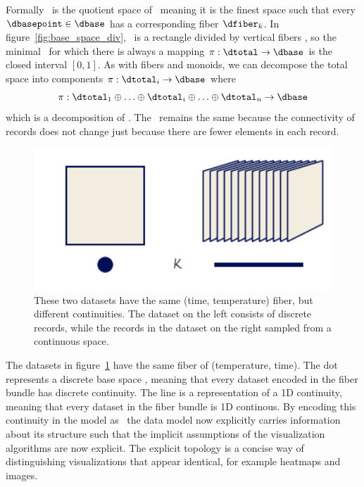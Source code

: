\documentclass[../main.tex]{subfiles}
\begin{document}
Formally \dbase\ is the quotient space \cite{QuotientSpaceTopology2020} of \dtotal\, meaning it is the finest space\cite{aurouxMath131Introduction} such that every $\dbasepoint \in \dbase$ has a corresponding fiber $\dfiber_k$\cite{QuotientSpaceTopology2020}. In figure~\ref{fig:base_space_div}, \dtotal\ is a rectangle divided by vertical fibers \dfiber, so the minimal \dbase\ for which there is always a mapping $\pi: \dtotal\rightarrow \dbase$ is the closed interval $\left[0,1\right]$. 
As with fibers and monoids, we can decompose the total space into components $\pi:\dtotal_i\rightarrow \dbase$ where
\begin{equation}
    \pi:\dtotal_1\oplus\ldots\oplus \dtotal_i \oplus\ldots \oplus \dtotal_n \rightarrow \dbase
\end{equation}
which is a decomposition of \dfiber. The \dbase\ remains the same because the connectivity of records does not change just because there are fewer elements in each record.
\begin{figure}[H]
    \includegraphics[width=1\textwidth]{figures/math/base.png}
    \caption{These two datasets have the same (time, temperature) fiber, but different continuities. The dataset on the left consists of discrete records, while the records in the dataset on the right sampled from a continuous space.} 
    \label{fig:base_example}
\end{figure}

The datasets in figure~\ref{fig:base_example} have the same fiber of (temperature, time). The dot represents a discrete base space \dbase, meaning that every dataset encoded in the fiber bundle has discrete continuity. The line is a representation of a 1D continuity, meaning that every dataset in the fiber bundle is 1D continous. By encoding this continuity in the model as \dbase\, the data model now explicitly carries information about its structure such that the implicit assumptions of the visualization algorithms are now explicit. The explicit topology is a concise way of distinguishing visualizations that appear identical, for example heatmaps and images.  
 
\end{document}
